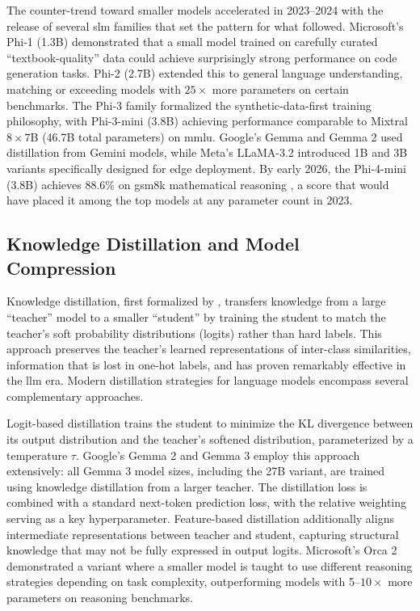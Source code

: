 The counter-trend toward smaller models accelerated in 2023--2024 with the release of several \gls{slm} families that set the pattern for what followed. Microsoft's Phi-1 (1.3B) \citep{gunasekar2023phi1} demonstrated that a small model trained on carefully curated ``textbook-quality'' data could achieve surprisingly strong performance on code generation tasks. Phi-2 (2.7B) \citep{microsoft2023phi2} extended this to general language understanding, matching or exceeding models with $25\times$ more parameters on certain benchmarks. The Phi-3 family \citep{abdin2024phi3} formalized the synthetic-data-first training philosophy, with Phi-3-mini (3.8B) achieving performance comparable to Mixtral $8\times7$B (46.7B total parameters) on \gls{mmlu}. Google's Gemma \citep{gemma2024} and Gemma 2 \citep{gemma2team2024} used distillation from Gemini models, while Meta's LLaMA-3.2 \citep{grattafiori2024llama3} introduced 1B and 3B variants specifically designed for edge deployment. By early 2026, the Phi-4-mini (3.8B) achieves 88.6\% on \gls{gsm8k} mathematical reasoning \citep{microsoft2025phi4mini}, a score that would have placed it among the top models at any parameter count in 2023.


\subsection{Knowledge Distillation and Model Compression}
\label{subsec:background_distillation}
Knowledge distillation, first formalized by \citet{hinton2015distilling}, transfers knowledge from a large ``teacher'' model to a smaller ``student'' by training the student to match the teacher's soft probability distributions (logits) rather than hard labels. This approach preserves the teacher's learned representations of inter-class similarities, information that is lost in one-hot labels, and has proven remarkably effective in the \gls{llm} era. Modern distillation strategies for language models encompass several complementary approaches.

Logit-based distillation trains the student to minimize the KL divergence between its output distribution and the teacher's softened distribution, parameterized by a temperature $\tau$. Google's Gemma 2 \citep{gemma2team2024} and Gemma 3 \citep{team2025gemma3} employ this approach extensively: all Gemma 3 model sizes, including the 27B variant, are trained using knowledge distillation from a larger teacher. The distillation loss is combined with a standard next-token prediction loss, with the relative weighting serving as a key hyperparameter. Feature-based distillation \citep{romero2015fitnets} additionally aligns intermediate representations between teacher and student, capturing structural knowledge that may not be fully expressed in output logits. Microsoft's Orca 2 \citep{mitra2023orca2} demonstrated a variant where a smaller model is taught to use different reasoning strategies depending on task complexity, outperforming models with 5--$10\times$ more parameters on reasoning benchmarks.

